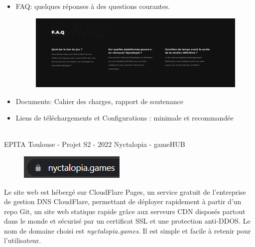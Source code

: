 \begin{itemize}
    \item FAQ: quelques réponses à des questions courantes.

\begin{figure}[H]
\centering
\begin{minipage}{.5\textwidth}
  \centering
  \centerline{\includegraphics[width=1\linewidth]{img/faq.PNG}}
  \label{fig:faq}
\end{minipage}%
\end{figure}

    \item Documents: Cahier des charges, rapport de soutenance

    \item Liens de téléchargements et Configurations : minimale et recommandée 

\end{itemize}

\vfill
\noindent\makebox[\linewidth]{\rule{.8\paperwidth}{.6pt}}\\[0.2cm]
EPITA Toulouse - Projet S2 - 2022 \hfill Nyctalopia - gameHUB
\noindent\makebox[\linewidth]{\rule{.8\paperwidth}{.6pt}}
\newpage


\begin{figure}[H]
\centering
\begin{minipage}{.5\textwidth}
  \centering
  \centerline{\includegraphics[width=1.5\linewidth]{img/ssl.png}}
  \label{fig:ssl}
\end{minipage}%
\end{figure}

Le site web est hébergé sur CloudFlare Pages, un service gratuit de l'entreprise de gestion DNS CloudFlare, permettant de déployer rapidement à partir d'un repo Git, un site web statique rapide grâce aux serveurs CDN disposés partout dans le monde et sécurisé par un certificat SSL et une protection anti-DDOS.
Le nom de domaine choisi est \emph{nyctalopia.games}. Il est simple et facile à retenir pour l'utilisateur.

